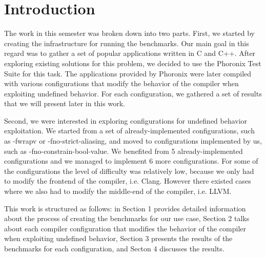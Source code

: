 \section{Introduction}

The work in this semester was broken down into two parts. First, we started by
creating the infrastructure for running the benchmarks. Our main goal in this
regard was to gather a set of popular applications written in C and C++. After
exploring existing solutions for this problem, we decided to use the Phoronix
Test Suite for this task. The applications provided by Phoronix were later
compiled with various configurations that modify the behavior of the compiler
when exploiting undefined behavior. For each configuration, we gathered a set of
results that we will present later in this work. \cite{iso90} %

Second, we were interested in exploring configurations for undefined behavior
exploitation. We started from a set of already-implemented configurations, such
as -fwrapv or -fno-strict-aliasing, and moved to configurations implemented by
us, such as -fno-constrain-bool-value. We benefited from 5 already-implemented
configurations and we managed to implement 6 more configurations. For some of
the configurations the level of difficulty was relatively low, because we only
had to modify the frontend of the compiler, i.e. Clang. However there existed
cases where we also had to modify the middle-end of the compiler, i.e. LLVM.

This work is structured as follows: in Section 1 provides detailed information
about the process of creating the benchmarks for our use case, Section 2 talks
about each compiler configuration that modifies the behavior of the compiler
when exploiting undefined behavior, Section 3 presents the results of the
benchmarks for each configuration, and Secton 4 discusses the results.
